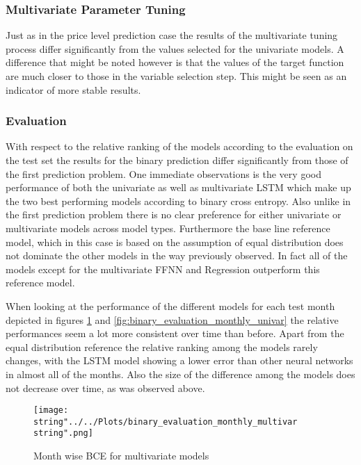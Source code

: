 \subsubsection{Multivariate Parameter Tuning}
Just as in the price level prediction case the results of the multivariate tuning process differ significantly from the values selected for the univariate models. A difference that might be noted however is that the values of the target function are much closer to those in the variable selection step. This might be seen as an indicator of more stable results. 

\subsubsection{Evaluation}
With respect to the relative ranking of the models according to the evaluation on the test set the results for the binary prediction differ significantly from those of the first prediction problem. One  immediate observations is the very good performance of both the univariate as well as multivariate LSTM which make up the two best performing models according to binary cross entropy. Also unlike in the first prediction problem there is no clear preference for either univariate or multivariate models across model types. Furthermore the base line reference model, which in this case is based on the assumption of equal distribution does not dominate the other models in the way previously observed. In fact all of the models except for the multivariate FFNN and Regression outperform this reference model. 


When looking at the performance of the different models for each test month depicted in figures \ref{fig:binary_evaluation_monthly_multivar} and \ref{fig:binary_evaluation_monthly_univar} the relative performances seem a lot more consistent over time than before. Apart from the equal distribution reference the relative ranking among the models rarely changes, with the LSTM model showing a lower error than other neural networks in almost all of the months. Also the size of the difference among the models does not decrease over time, as was observed above.
\begin{figure}[h!]
  \centering
\texttt{[image: \\string"../../Plots/binary\_evaluation\_monthly\_multivar\\string".png]}
  \caption{Month wise BCE for multivariate models}\label{fig:binary_evaluation_monthly_multivar}
\end{figure}

